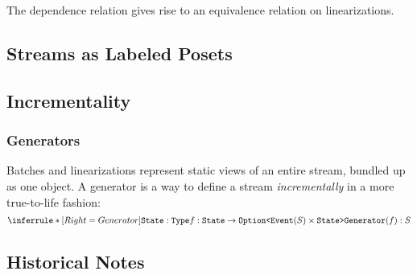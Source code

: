 The dependence relation gives rise to an equivalence relation on linearizations.


\subsection{Streams as Labeled Posets}


\subsection{Incrementality}

\subsubsection{Generators}

Batches and linearizations represent static views of an entire stream, bundled up as one object. A generator is a way to define a stream \emph{incrementally} in a more true-to-life fashion:
\[
\inference[Generator]
{
  \texttt{State}: \texttt{Type} \\
  f: \texttt{State} \to \texttt{Option<}\texttt{Event}(S) \times \texttt{State>}
}
{
  \texttt{Generator}(f): S
}
\]

\subsection{Historical Notes}
